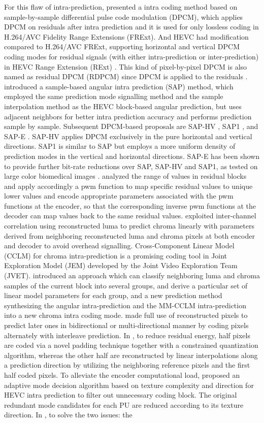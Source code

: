 \documentclass[journal]{IEEEtran}
\begin{document}
For this flaw of intra-prediction, \cite{d} presented a intra coding method based on sample-by-sample differential pulse code modulation (DPCM), which applies DPCM on residuals after intra prediction and it is used for only lossless coding in H.264/AVC Fidelity Range Extensions (FRExt). And HEVC had modification compared to H.264/AVC FRExt, supporting horizontal and vertical DPCM coding modes for residual signals (with either intra-prediction or inter-prediction) in HEVC Range Extension (RExt) \cite{e, h}. This kind of pixel-by-pixel DPCM is also named as residual DPCM (RDPCM) since DPCM is applied to the residuals \cite{i}.
 \cite{09} introduced a sample-based angular intra prediction (SAP) method, which employed the same prediction mode signalling method and the sample interpolation method as the HEVC block-based angular prediction, but uses adjacent neighbors for better intra prediction accuracy and performs prediction sample by sample. Subsequent DPCM-based proposals are SAP-HV \cite{10}, SAP1 \cite{11}, and SAP-E \cite{12}. SAP-HV applies DPCM exclusively in the pure horizontal and vertical directions. SAP1 is similar to SAP but employs a more uniform density of prediction modes in the vertical and horizontal directions. SAP-E has been shown to provide further bit-rate reductions over SAP, SAP-HV and SAP1, as tested on large color biomedical images \cite{12}. \cite{13} analyzed the range of values in residual blocks and apply accordingly a pwm function to map specific residual values to unique lower values and encode appropriate parameters associated with the pwm functions at the encoder, so that the corresponding inverse pwm functions at the decoder can map values back to the same residual values. \cite{14} exploited inter-channel correlation using reconstructed luma to predict chroma linearly with parameters derived from neighboring reconstructed luma and chroma pixels at both encoder and decoder to avoid overhead signalling. Cross-Component Linear Model (CCLM) for chroma intra-prediction is a promising coding tool in Joint Exploration Model (JEM) developed by the Joint Video Exploration Team (JVET). \cite{15} introduced an approach which can classify neighboring luma and chroma samples of the current block into several groups, and derive a particular set of linear model parameters for each group, and a new prediction method synthesizing the angular intra-prediction and the MM-CCLM intra-prediction into a new chroma intra coding mode. \cite{16} made full use of reconstructed pixels to predict later ones in bidirectional or multi-directional manner by coding pixels alternately with interleave prediction. In \cite{17}, to reduce residual energy, half pixels are coded via a novel padding technique together with a constrained quantization algorithm, whereas the other half are reconstructed by linear interpolations along a prediction direction by utilizing the neighboring reference pixels and the first half coded pixels. To alleviate the encoder computational load, \cite{18} proposed an adaptive mode decision algorithm based on texture complexity and direction for HEVC intra prediction to filter out unnecessary coding block. The original redundant mode candidates for each PU are reduced according to its texture direction. In \cite{19}, to solve the two issues: the 
\end{document}
